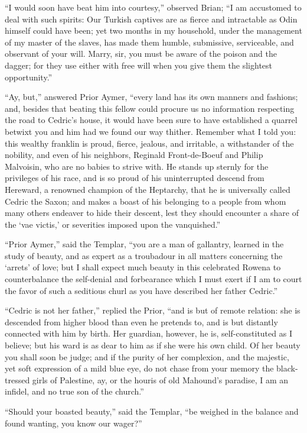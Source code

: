``I would soon have beat him into courtesy,'' observed Brian; ``I am
accustomed to deal with such spirits: Our Turkish captives are as fierce
and intractable as Odin himself could have been; yet two months in my
household, under the management of my master of the slaves, has made
them humble, submissive, serviceable, and observant of your will. Marry,
sir, you must be aware of the poison and the dagger; for they use either
with free will when you give them the slightest opportunity.''

``Ay, but,'' answered Prior Aymer, ``every land has its own manners and
fashions; and, besides that beating this fellow could procure us no
information respecting the road to Cedric's house, it would have been
sure to have established a quarrel betwixt you and him had we found our
way thither. Remember what I told you: this wealthy franklin is proud,
fierce, jealous, and irritable, a withstander of the nobility, and even
of his neighbors, Reginald Front-de-Boeuf and Philip Malvoisin, who are
no babies to strive with. He stands up sternly for the privileges of his
race, and is so proud of his uninterrupted descend from Hereward, a
renowned champion of the Heptarchy, that he is universally called Cedric
the Saxon; and makes a boast of his belonging to a people from whom many
others endeaver to hide their descent, lest they should encounter a
share of the `vae victis,' or severities imposed upon the vanquished.''

``Prior Aymer,'' said the Templar, ``you are a man of gallantry, learned
in the study of beauty, and as expert as a troubadour in all matters
concerning the `arrets' of love; but I shall expect much beauty in this
celebrated Rowena to counterbalance the self-denial and forbearance
which I must exert if I am to court the favor of such a seditious churl
as you have described her father Cedric.''

``Cedric is not her father,'' replied the Prior, ``and is but of remote
relation: she is descended from higher blood than even he pretends to,
and is but distantly connected with him by birth. Her guardian, however,
he is, self-constituted as I believe; but his ward is as dear to him as
if she were his own child. Of her beauty you shall soon be judge; and if
the purity of her complexion, and the majestic, yet soft expression of a
mild blue eye, do not chase from your memory the black-tressed girls of
Palestine, ay, or the houris of old Mahound's paradise, I am an infidel,
and no true son of the church.''

``Should your boasted beauty,'' said the Templar, ``be weighed in the
balance and found wanting, you know our wager?''

